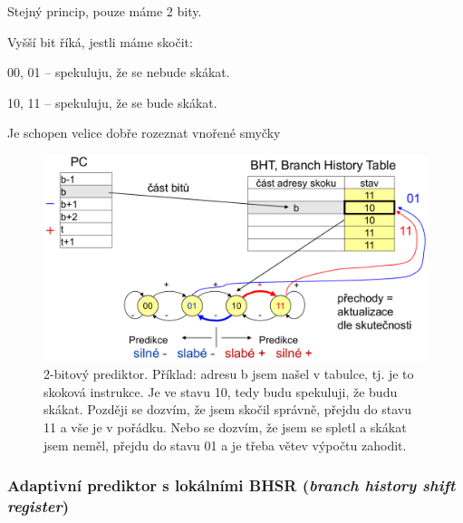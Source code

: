 \begin{compactitem}
    \item Stejný princip, pouze máme 2 bity.
    \item Vyšší bit říká, jestli máme skočit: \begin{compactitem}
        \item 00, 01 -- spekuluju, že se nebude skákat.
        \item 10, 11 -- spekuluju, že se bude skákat.
    \end{compactitem}
    \item Je schopen velice dobře rozeznat vnořené smyčky

    \begin{figure}[H]
        \centering
        \includegraphics[width=0.75\linewidth]{prediktor_dvoubitovy.pdf}
        \caption{2-bitový prediktor. Příklad: adresu b jsem našel v tabulce, tj. je to skoková instrukce. Je ve stavu 10, tedy budu spekuluji, že budu skákat. Později se dozvím, že jsem skočil správně, přejdu do stavu 11 a vše je v pořádku. Nebo se dozvím, že jsem se spletl a skákat jsem neměl, přejdu do stavu 01 a je třeba větev výpočtu zahodit.}
    \end{figure}
\end{compactitem}

\subsubsection{Adaptivní prediktor s lokálními BHSR (\textit{branch history shift register})}

